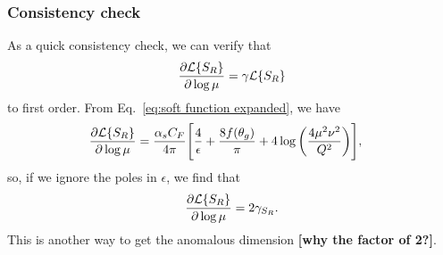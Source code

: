 \documentclass[11pt,twoside,reqno]{amsart}
\theoremstyle{plain}
\theoremstyle{remark}
\theoremstyle{definition}
\theoremstyle{remark}
\theoremstyle{definition}
\theoremstyle{definition}
\newcommand{\cL}{\mathcal{L}}
\begin{document}
\subsubsection{Consistency check}
	As a quick consistency check, we can verify that
	\begin{equation}
		\frac{\partial \cL\qty{S_R}}{\partial \log \mu} = \gamma \cL\qty{S_R}
	\end{equation}
	to first order. From Eq.~\ref{eq:soft function expanded}, we have
	\begin{equation}
	\begin{aligned}
		\frac{\partial \cL\qty{S_R}}{\partial \log \mu} &= \frac{\alpha_s C_F}{4\pi}\Bigg[ \frac{4}{\epsilon} + \frac{8 f(\theta_g)}{\pi} + 4\log\qty(\frac{4\mu^2\nu^2}{Q^2}) \Bigg],
	\end{aligned}
	\end{equation}
	so, if we ignore the poles in $\epsilon$, we find that
	\begin{equation}
		\frac{\partial \cL\qty{S_R}}{\partial \log \mu} = 2\gamma_{S_R}.
	\end{equation}
	This is another way to get the anomalous dimension {\color{red}\textbf{[why the factor of 2?]}}.
\end{document}
